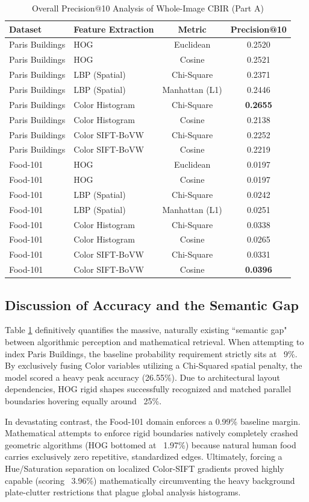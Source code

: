 \documentclass[11pt, a4paper]{article}
\begin{document}
\begin{table}[h]
\centering
\begin{tabular}{@{}llcc@{}}
\toprule
\textbf{Dataset} & \textbf{Feature Extraction} & \textbf{Metric} & \textbf{Precision@10} \\ \midrule
Paris Buildings & HOG & Euclidean & 0.2520 \\
Paris Buildings & HOG & Cosine & 0.2521 \\
Paris Buildings & LBP (Spatial) & Chi-Square & 0.2371 \\
Paris Buildings & LBP (Spatial) & Manhattan (L1) & 0.2446 \\
Paris Buildings & Color Histogram & Chi-Square & \textbf{0.2655} \\
Paris Buildings & Color Histogram & Cosine & 0.2138 \\
Paris Buildings & Color SIFT-BoVW & Chi-Square & 0.2252 \\
Paris Buildings & Color SIFT-BoVW & Cosine & 0.2219 \\ \midrule
Food-101 & HOG & Euclidean & 0.0197 \\
Food-101 & HOG & Cosine & 0.0197 \\
Food-101 & LBP (Spatial) & Chi-Square & 0.0242 \\
Food-101 & LBP (Spatial) & Manhattan (L1) & 0.0251 \\
Food-101 & Color Histogram & Chi-Square & 0.0338 \\
Food-101 & Color Histogram & Cosine & 0.0265 \\
Food-101 & Color SIFT-BoVW & Chi-Square & 0.0331 \\
Food-101 & Color SIFT-BoVW & Cosine & \textbf{0.0396} \\
\bottomrule
\end{tabular}
\caption{Overall Precision@10 Analysis of Whole-Image CBIR (Part A)}
\label{tab:precision_partA}
\end{table}

\subsection{Discussion of Accuracy and the Semantic Gap}
Table \ref{tab:precision_partA} definitively quantifies the massive, naturally existing ``semantic gap" between algorithmic perception and mathematical retrieval. 
When attempting to index Paris Buildings, the baseline probability requirement strictly sits at ~9\%. By exclusively fusing Color variables utilizing a Chi-Squared spatial penalty, the model scored a heavy peak accuracy (26.55\%). Due to architectural layout dependencies, HOG rigid shapes successfully recognized and matched parallel boundaries hovering equally around ~25\%.

In devastating contrast, the Food-101 domain enforces a 0.99\% baseline margin. Mathematical attempts to enforce rigid boundaries natively completely crashed geometric algorithms (HOG bottomed at ~1.97\%) because natural human food carries exclusively zero repetitive, standardized edges. Ultimately, forcing a Hue/Saturation separation on localized Color-SIFT gradients proved highly capable (scoring ~3.96\%) mathematically circumventing the heavy background plate-clutter restrictions that plague global analysis histograms. 
\end{document}
